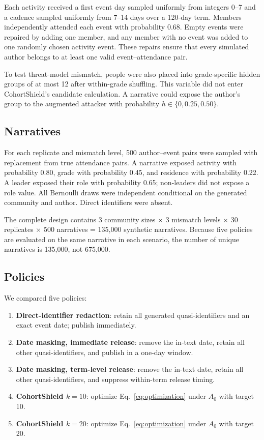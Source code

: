 \documentclass[pdflatex,sn-mathphys-num]{sn-jnl}
\theoremstyle{plain}
\begin{document}
Each activity received a first event day sampled uniformly from integers 0--7 and a cadence sampled uniformly from 7--14 days over a 120-day term. Members independently attended each event with probability 0.68. Empty events were repaired by adding one member, and any member with no event was added to one randomly chosen activity event. These repairs ensure that every simulated author belongs to at least one valid event--attendance pair.

To test threat-model mismatch, people were also placed into grade-specific hidden groups of at most 12 after within-grade shuffling. This variable did not enter CohortShield's candidate calculation. A narrative could expose the author's group to the augmented attacker with probability $h\in\{0,0.25,0.50\}$.

\subsection{Narratives}

For each replicate and mismatch level, 500 author--event pairs were sampled with replacement from true attendance pairs. A narrative exposed activity with probability 0.80, grade with probability 0.45, and residence with probability 0.22. A leader exposed their role with probability 0.65; non-leaders did not expose a role value. All Bernoulli draws were independent conditional on the generated community and author. Direct identifiers were absent.

The complete design contains $3$ community sizes $\times$ $3$ mismatch levels $\times$ $30$ replicates $\times$ $500$ narratives = 135,000 synthetic narratives. Because five policies are evaluated on the same narrative in each scenario, the number of unique narratives is 135,000, not 675,000.

\subsection{Policies}

We compared five policies:

\begin{enumerate}
\item \textbf{Direct-identifier redaction}: retain all generated quasi-identifiers and an exact event date; publish immediately.
\item \textbf{Date masking, immediate release}: remove the in-text date, retain all other quasi-identifiers, and publish in a one-day window.
\item \textbf{Date masking, term-level release}: remove the in-text date, retain all other quasi-identifiers, and suppress within-term release timing.
\item \textbf{CohortShield $k=10$}: optimize Eq.~\eqref{eq:optimization} under $A_0$ with target 10.
\item \textbf{CohortShield $k=20$}: optimize Eq.~\eqref{eq:optimization} under $A_0$ with target 20.
\end{enumerate}
\end{document}
